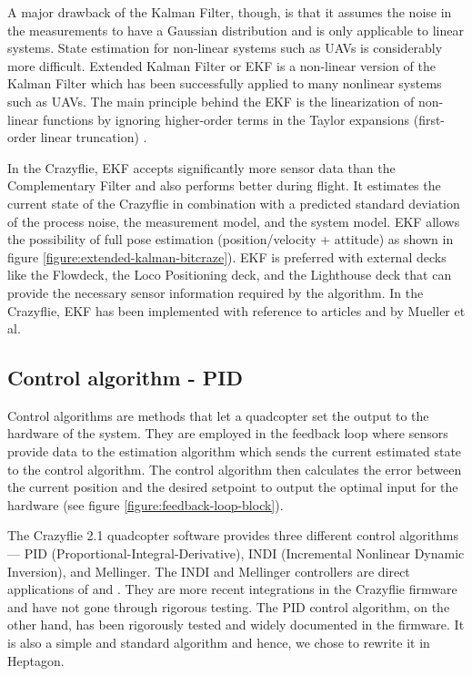 \documentclass[10pt, a4paper]{article}
\begin{document}
    A major drawback of the Kalman Filter, though, is that it assumes the noise in the measurements to have a Gaussian distribution and is only applicable to linear systems. State estimation for non-linear systems such as UAVs is considerably more difficult. Extended Kalman Filter or EKF is a non-linear version of the Kalman Filter which has been successfully applied to many nonlinear systems such as UAVs. The main principle behind the EKF is the linearization of non-linear functions by ignoring higher-order terms in the Taylor expansions (first-order linear truncation) \cite{book:quan2017-EKF}.

    In the Crazyflie, EKF accepts significantly more sensor data than the Complementary Filter and also performs better during flight. It estimates the current state of the Crazyflie in combination with a predicted standard deviation of the process noise, the measurement model, and the system model. EKF allows the possibility of full pose estimation (position/velocity + attitude) as shown in figure \ref{figure:extended-kalman-bitcraze}). EKF is preferred with external decks like the Flowdeck, the Loco Positioning deck, and the Lighthouse deck that can provide the necessary sensor information \cite{web:stateEstimator/bitcraze} required by the algorithm. In the Crazyflie, EKF has been implemented with reference to articles \cite{article:kalman-implementation-1} and \cite{article:kalman-implementation-2} by Mueller et al.
    
    \subsection{Control algorithm - PID}
    \label{section:controller}
    Control algorithms are methods that let a quadcopter set the output to the hardware of the system. They are employed in the feedback loop where sensors provide data to the estimation algorithm which sends the current estimated state to the control algorithm. The control algorithm then calculates the error between the current position and the desired setpoint to output the optimal input for the hardware (see figure \ref{figure:feedback-loop-block}).

    The Crazyflie 2.1 quadcopter software provides three different control algorithms--- PID (Proportional-Integral-Derivative), INDI (Incremental Nonlinear Dynamic Inversion), and Mellinger. The INDI and Mellinger controllers are direct applications of \cite{article:indi} and \cite{article:mellinger}. They are more recent integrations in the Crazyflie firmware and have not gone through rigorous testing. The PID control algorithm, on the other hand, has been rigorously tested and widely documented in the firmware. It is also a simple and standard algorithm and hence, we chose to rewrite it in Heptagon.
\end{document}
